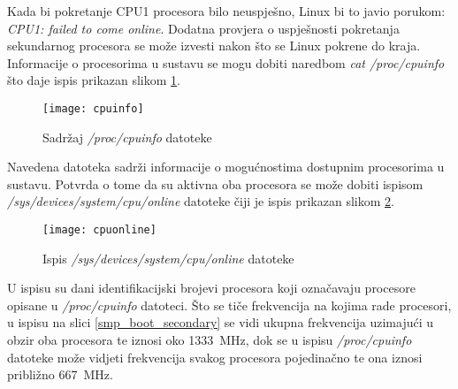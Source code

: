 \documentclass[times, utf8, diplomski, numeric]{fer}
\begin{document}
Kada bi pokretanje CPU1 procesora bilo neuspješno, Linux bi to javio porukom: \textit{CPU1: failed to come online}.
Dodatna provjera o uspješnosti pokretanja sekundarnog procesora se može izvesti nakon što se Linux pokrene do kraja.
Informacije o procesorima u sustavu se mogu dobiti naredbom \textit{cat /proc/cpuinfo} što daje ispis prikazan slikom
\ref{cpuinfo}.
\begin{figure}[H]
  \centering
  \texttt{[image: cpuinfo]}
  \caption{Sadržaj \textit{/proc/cpuinfo} datoteke}
  \label{cpuinfo}
\end{figure}
Navedena datoteka sadrži informacije o mogućnostima dostupnim procesorima u sustavu. Potvrda o tome da su aktivna oba
procesora se može dobiti ispisom \textit{/sys/devices/system/cpu/online} datoteke čiji je ispis prikazan slikom \ref{cpuonline}.
\begin{figure}[H]
  \centering
  \texttt{[image: cpuonline]}
  \caption{Ispis \textit{/sys/devices/system/cpu/online} datoteke}
  \label{cpuonline}
\end{figure}
U ispisu su dani identifikacijski brojevi procesora koji označavaju procesore opisane u \textit{/proc/cpuinfo} datoteci.
Što se tiče frekvencija na kojima rade procesori, u ispisu na slici \ref{smp_boot_secondary} se vidi ukupna frekvencija
uzimajući u obzir oba procesora te iznosi oko 1333~MHz, dok se u ispisu \textit{/proc/cpuinfo} datoteke može vidjeti
frekvencija svakog procesora pojedinačno te ona iznosi približno 667~MHz.
\end{document}
